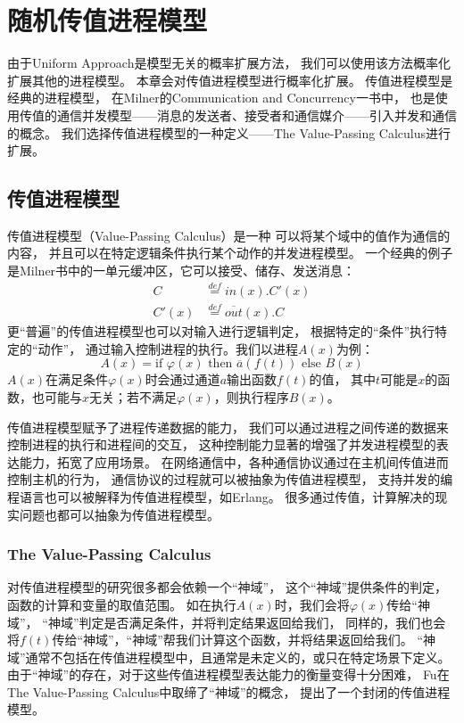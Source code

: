 
\chapter{随机传值进程模型}

由于Uniform Approach是模型无关的概率扩展方法，
我们可以使用该方法概率化扩展其他的进程模型。
本章会对传值进程模型进行概率化扩展。
传值进程模型是经典的进程模型，
在Milner的Communication and Concurrency一书中，
也是使用传值的通信并发模型——消息的发送者、接受者和通信媒介——引入并发和通信的概念。
我们选择传值进程模型的一种定义——The Value-Passing Calculus进行扩展。

\section{传值进程模型}
传值进程模型（Value-Passing Calculus）是一种
可以将某个域中的值作为通信的内容，
并且可以在特定逻辑条件执行某个动作的并发进程模型。
一个经典的例子是Milner书中的一单元缓冲区，它可以接受、储存、发送消息：
\begin{align*}
   C&\stackrel{def}{=}in(x).C'(x)\\
   C'(x)&\stackrel{def}{=}\overline{out}(x).C
\end{align*}
更“普遍”的传值进程模型也可以对输入进行逻辑判定，
根据特定的“条件”执行特定的“动作”，
通过输入控制进程的执行。我们以进程$A(x)$为例：
$$A(x)=\textrm{if }\varphi(x)\textrm{ then }\overline{a}(f(t))\textrm{ else }B(x)$$
$A(x)$在满足条件$\varphi(x)$时会通过通道$a$输出函数$f(t)$的值，
其中$t$可能是$x$的函数，也可能与$x$无关；若不满足$\varphi(x)$，则执行程序$B(x)$。

传值进程模型赋予了进程传递数据的能力，
我们可以通过进程之间传递的数据来控制进程的执行和进程间的交互，
这种控制能力显著的增强了并发进程模型的表达能力，拓宽了应用场景。
在网络通信中，各种通信协议通过在主机间传值进而控制主机的行为，
通信协议的过程就可以被抽象为传值进程模型，
支持并发的编程语言也可以被解释为传值进程模型，如Erlang。
很多通过传值，计算解决的现实问题也都可以抽象为传值进程模型。


\subsection{The Value-Passing Calculus}\label{ch:vpc}
对传值进程模型的研究很多都会依赖一个“神域”，
这个“神域”提供条件的判定，函数的计算和变量的取值范围。
如在执行$A(x)$时，我们会将$\varphi(x)$传给“神域”，
“神域”判定是否满足条件，并将判定结果返回给我们，
同样的，我们也会将$f(t)$传给“神域”，“神域”帮我们计算这个函数，并将结果返回给我们。
“神域”通常不包括在传值进程模型中，且通常是未定义的，或只在特定场景下定义。
由于“神域”的存在，对于这些传值进程模型表达能力的衡量变得十分困难，
Fu在The Value-Passing Calculus中取缔了“神域”的概念，
提出了一个封闭的传值进程模型。


